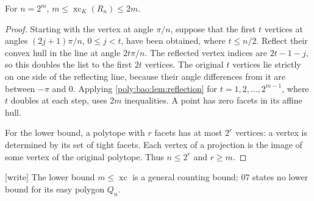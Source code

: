 \documentclass[11pt,a4paper]{article}
\numberwithin{equation}{section}
\theoremstyle{plain}
\newcommand{\wtag}{\textup{[write]}}%
\newcommand{\xc}{\operatorname{xc}}
\begin{document}
\begin{corollary}[Source 04]\label{poly:bao:cor:regular}
For $n=2^m$, $m\leq\xc_K(R_n)\leq2m$.
\end{corollary}
\begin{proof}
Starting with the vertex at angle $\pi/n$, suppose that the first $t$
vertices at angles $(2j+1)\pi/n$, $0\leq j<t$, have been obtained, where
$t\leq n/2$. Reflect their convex hull in the line at angle $2t\pi/n$.
The reflected vertex indices are $2t-1-j$, so this doubles the list to
the first $2t$ vertices. The original $t$ vertices lie strictly on one
side of the reflecting line, because their angle differences from it
are between $-\pi$ and $0$. Applying \cref{poly:bao:lem:reflection} for
$t=1,2,\ldots,2^{m-1}$, where $t$ doubles at each step, uses $2m$
inequalities. A point has zero facets in its affine hull.

For the lower bound, a polytope with $r$ facets has at most $2^r$ vertices:
a vertex is determined by its set of tight facets. Each vertex of a
projection is the image of some vertex of the original polytope. Thus
$n\leq2^r$ and $r\geq m$.
\end{proof}

\wtag{} The lower bound $m\leq\xc$ is a general counting bound; 07 states no
lower bound for its easy polygon $Q_n$.
\end{document}

